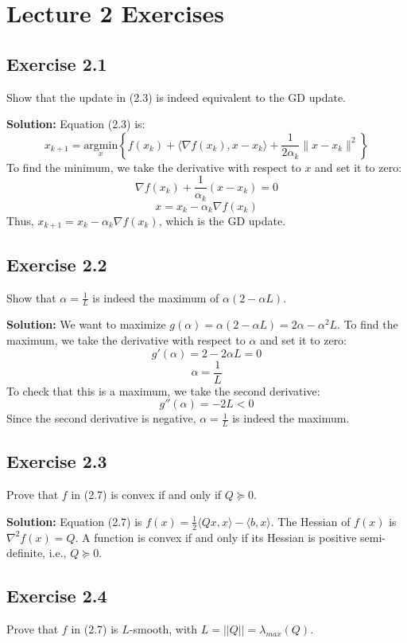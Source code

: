 \documentclass{article}
\begin{document}
\section*{Lecture 2 Exercises}

\subsection*{Exercise 2.1}
Show that the update in (2.3) is indeed equivalent to the GD update.

\textbf{Solution:}
Equation (2.3) is:
\[
x_{k+1} = \underset{x}{\text{argmin}} \left\{ f(x_k) + \langle \nabla f(x_k), x - x_k \rangle + \frac{1}{2\alpha_k} \|x - x_k\|^2 \right\}
\]
To find the minimum, we take the derivative with respect to $x$ and set it to zero:
\[
\nabla f(x_k) + \frac{1}{\alpha_k} (x - x_k) = 0
\]
\[
x = x_k - \alpha_k \nabla f(x_k)
\]
Thus, $x_{k+1} = x_k - \alpha_k \nabla f(x_k)$, which is the GD update.

\subsection*{Exercise 2.2}
Show that $\alpha = \frac{1}{L}$ is indeed the maximum of $\alpha(2 - \alpha L)$.

\textbf{Solution:}
We want to maximize $g(\alpha) = \alpha(2 - \alpha L) = 2\alpha - \alpha^2 L$.
To find the maximum, we take the derivative with respect to $\alpha$ and set it to zero:
\[
g'(\alpha) = 2 - 2\alpha L = 0
\]
\[
\alpha = \frac{1}{L}
\]
To check that this is a maximum, we take the second derivative:
\[
g''(\alpha) = -2L < 0
\]
Since the second derivative is negative, $\alpha = \frac{1}{L}$ is indeed the maximum.

\subsection*{Exercise 2.3}
Prove that $f$ in (2.7) is convex if and only if $Q \succeq 0$.

\textbf{Solution:}
Equation (2.7) is $f(x) = \frac{1}{2} \langle Qx, x \rangle - \langle b, x \rangle$.
The Hessian of $f(x)$ is $\nabla^2 f(x) = Q$.
A function is convex if and only if its Hessian is positive semi-definite, i.e., $Q \succeq 0$.

\subsection*{Exercise 2.4}
Prove that $f$ in (2.7) is $L$-smooth, with $L = ||Q|| = \lambda_{max}(Q)$.
\end{document}
